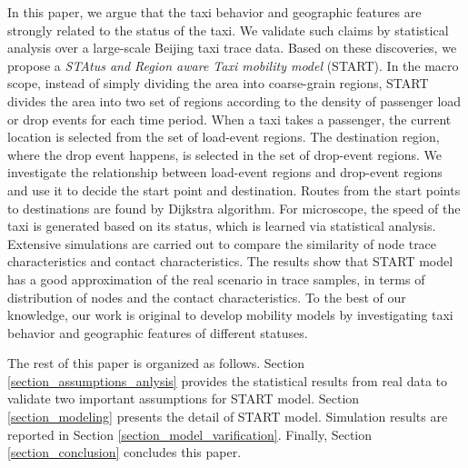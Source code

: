 In this paper, we argue that the taxi behavior and geographic features are strongly related to the status of the taxi. We validate such claims by statistical analysis over a large-scale Beijing taxi trace data. Based on these discoveries, we propose a \emph{STAtus and Region aware Taxi mobility model} (START). In the macro scope, instead of simply dividing the area into coarse-grain regions, START divides the area into two set of regions according to the density of passenger load or drop events for each time period.
When a taxi takes a passenger, the current location is selected from the set of load-event regions. The destination region, where the drop event happens, is selected in the set of drop-event regions.
We investigate the relationship between load-event regions and drop-event regions and use it to decide the start point and destination. Routes from the start points to destinations are found by Dijkstra algorithm. For microscope, the speed of the taxi is generated based on its status, which is learned via statistical analysis. Extensive simulations are carried out to compare the similarity of node trace characteristics and contact characteristics. The results show that START model has a good approximation of the real scenario in trace samples, in terms of distribution of nodes and the contact characteristics. To the best of our knowledge, our work is original to develop mobility models by investigating taxi behavior and geographic features of different statuses.

The rest of this paper is organized as follows. Section \ref{section_assumptions_anlysis} provides the statistical results from real data to validate two important assumptions for START model. Section \ref{section_modeling} presents the detail of START model. Simulation results are reported in Section \ref{section_model_varification}. Finally, Section \ref{section_conclusion} concludes this paper.


